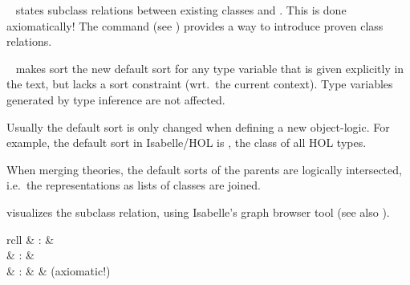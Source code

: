 \begin{isabellebody}
\begin{isamarkuptext}
\begin{description}
  \item \hyperlink{command.classrel}{\mbox{}}~ states subclass
  relations between existing classes  and .
  This is done axiomatically!  The \hyperlink{command.instance}{\mbox{}} command
  (see ) provides a way to introduce proven class
  relations.

  \item \hyperlink{command.defaultsort}{\mbox{}}~ makes sort  the
  new default sort for any type variable that is given explicitly in
  the text, but lacks a sort constraint (wrt.\ the current context).
  Type variables generated by type inference are not affected.

  Usually the default sort is only changed when defining a new
  object-logic.  For example, the default sort in Isabelle/HOL is
  , the class of all HOL types.  %

  When merging theories, the default sorts of the parents are
  logically intersected, i.e.\ the representations as lists of classes
  are joined.

  \item \hyperlink{command.class-deps}{\mbox{}} visualizes the subclass relation,
  using Isabelle's graph browser tool (see also \cite{isabelle-sys}).

  \end{description}%
\end{isamarkuptext}%
\isamarkuptrue%
%
\isamarkuptrue%
%
\begin{isamarkuptext}%
\begin{matharray}{rcll}
    \hypertarget{command.types}{\hyperlink{command.types}{\mbox{}}} & : &  \\
    \hypertarget{command.typedecl}{\hyperlink{command.typedecl}{\mbox{}}} & : &  \\
    \hypertarget{command.arities}{\hyperlink{command.arities}{\mbox{}}} & : &  & (axiomatic!) \\
  \end{matharray}


\end{isamarkuptext}
\end{isabellebody}
